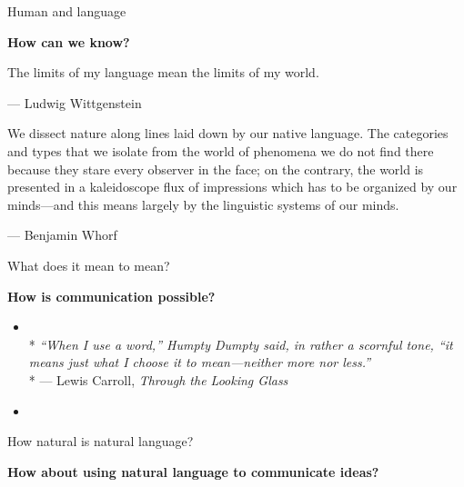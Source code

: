 \documentclass{beamer}
\begin{document}
\begin{frame}{Human and language}

  \textbf{How can we know?}

  \pause

  \begin{displayquote}
    The limits of my language mean the limits of my world.
  \end{displayquote}
  --- Ludwig Wittgenstein

  \pause

  \begin{displayquote}
    We dissect nature along lines laid down by our native language.
    The categories and types that we isolate from the world of phenomena
    we do not find there because they stare every observer in the face;
    on the contrary, the world is presented in a kaleidoscope flux
    of impressions which has to be organized by our minds—and this
    means largely by the linguistic systems of our minds.
  \end{displayquote}
  --- Benjamin Whorf
  
\end{frame}

\begin{frame}{What does it mean to mean?}


  \textbf{How is communication possible?}
  \begin{itemize}
    \pause
    
    \item \textiota\textdelta\textiota\textomikron\textvarsigma
      \ \textkappa\textomikron\textsigma\textmu\textomikron\textvarsigma \\*
      \pause
      \textit{“When I use a word,” Humpty Dumpty said, in rather a scornful tone,
        “it means just what I choose it to mean—neither more nor less.”}
      \\* --- Lewis Carroll, \textit{Through the Looking Glass}

      \pause
      
    \item \textkappa\textomikron\textiota\textnu\textomikron\textvarsigma
      \ \textkappa\textomikron\textsigma\textmu\textomikron\textvarsigma
    
  \end{itemize}
  
\end{frame}


\begin{frame}{How natural is natural language?}

  \textbf{How about using natural language to communicate ideas?}
  
\end{frame}
\end{document}
